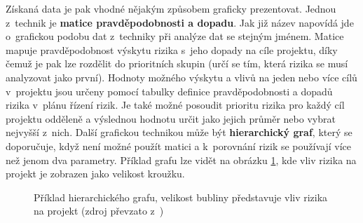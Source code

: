Získaná data je pak vhodné nějakým způsobem graficky prezentovat. Jednou z~technik je \textbf{matice pravděpodobnosti a dopadu}. Jak již název napovídá jde o~grafickou podobu dat z~techniky při analýze dat se stejným jménem. Matice mapuje pravděpodobnost výskytu rizika s~jeho dopady na cíle projektu, díky čemuž je pak lze rozdělit do prioritních skupin (určí se tím, která rizika se musí analyzovat jako první). Hodnoty možného výskytu a vlivů na jeden nebo více cílů v~projektu jsou určeny pomocí tabulky definice pravděpodobnosti a dopadů rizika v~plánu řízení rizik. Je také možné posoudit prioritu rizika pro každý cíl projektu odděleně a výslednou hodnotu určit jako jejich průměr nebo vybrat nejvyšší z~nich. Další grafickou technikou může být \textbf{hierarchický graf}, který se doporučuje, když není možné použít matici a k~porovnání rizik se používají více než jenom dva parametry. Příklad grafu lze vidět na obrázku \ref{hierarKvalita}, kde vliv rizika na projekt je zobrazen jako velikost kroužku. 

    \begin{figure}[ht]
    \begin{center}
    \caption{Příklad hierarchického grafu, velikost bubliny představuje vliv rizika na projekt (zdroj převzato z~\cite{PMBOK})}
    \label{hierarKvalita}
    \end{center}
    \end{figure}


